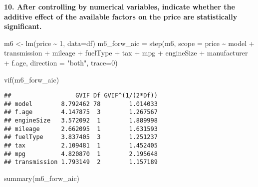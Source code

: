 \documentclass[
]{article}
\newenvironment{Shaded}{\begin{snugshade}}{\end{snugshade}}
\newcommand{\AttributeTok}[1]{\textcolor[rgb]{0.77,0.63,0.00}{#1}}
\newcommand{\DecValTok}[1]{\textcolor[rgb]{0.00,0.00,0.81}{#1}}
\newcommand{\FunctionTok}[1]{\textcolor[rgb]{0.00,0.00,0.00}{#1}}
\newcommand{\NormalTok}[1]{#1}
\newcommand{\OtherTok}[1]{\textcolor[rgb]{0.56,0.35,0.01}{#1}}
\newcommand{\SpecialCharTok}[1]{\textcolor[rgb]{0.00,0.00,0.00}{#1}}
\newcommand{\StringTok}[1]{\textcolor[rgb]{0.31,0.60,0.02}{#1}}
\begin{document}
\newpage

\textbf{10. After controlling by numerical variables, indicate whether the additive effect of the available factors on the price are statistically significant.}

\begin{Shaded}
\begin{Highlighting}[]
\NormalTok{m6 }\OtherTok{\textless{}{-}} \FunctionTok{lm}\NormalTok{(price }\SpecialCharTok{\textasciitilde{}}  \DecValTok{1}\NormalTok{, }\AttributeTok{data=}\NormalTok{df)}
\NormalTok{m6\_forw\_aic }\OtherTok{=} \FunctionTok{step}\NormalTok{(m6,}
\AttributeTok{scope =}\NormalTok{ price }\SpecialCharTok{\textasciitilde{}}\NormalTok{ model }\SpecialCharTok{+}\NormalTok{ transmission }\SpecialCharTok{+}\NormalTok{ mileage }\SpecialCharTok{+}\NormalTok{ fuelType }\SpecialCharTok{+}\NormalTok{ tax }\SpecialCharTok{+}\NormalTok{ mpg }\SpecialCharTok{+}
\NormalTok{                engineSize }\SpecialCharTok{+}\NormalTok{ manufacturer }\SpecialCharTok{+}\NormalTok{ f.age, }\AttributeTok{direction =} \StringTok{"both"}\NormalTok{, }\AttributeTok{trace=}\DecValTok{0}\NormalTok{)}

\FunctionTok{vif}\NormalTok{(m6\_forw\_aic)}
\end{Highlighting}
\end{Shaded}

\begin{verbatim}
##                  GVIF Df GVIF^(1/(2*Df))
## model        8.792462 78        1.014033
## f.age        4.147875  3        1.267567
## engineSize   3.572092  1        1.889998
## mileage      2.662095  1        1.631593
## fuelType     3.837405  3        1.251237
## tax          2.109481  1        1.452405
## mpg          4.820870  1        2.195648
## transmission 1.793149  2        1.157189
\end{verbatim}

\begin{Shaded}
\begin{Highlighting}[]
\FunctionTok{summary}\NormalTok{(m6\_forw\_aic)}
\end{Highlighting}
\end{Shaded}
\end{document}
